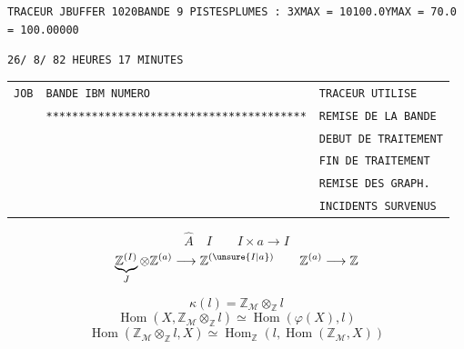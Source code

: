 
\noindent\texttt{TRACEUR J\quad BUFFER 1020\quad BANDE 9 PISTES\quad PLUMES : 3\quad XMAX = 10100.0\quad YMAX = 70.0\quad {} = 100.00000}

\noindent\texttt{26/ 8/ 82 HEURES 17 MINUTES}

\begin{tabular}{lll}
\texttt{JOB}&\texttt{BANDE IBM NUMERO}&\texttt{TRACEUR UTILISE}\\
&\texttt{****************************************}&\texttt{REMISE DE LA BANDE}\\
&&\texttt{DEBUT DE TRAITEMENT}\\
&&\texttt{FIN DE TRAITEMENT}\\
&&\texttt{REMISE DES GRAPH.}\\
&&\texttt{INCIDENTS SURVENUS}
\end{tabular}

\[
\widehat A\quad I\qquad I\times a\longrightarrow I
\]
\[
\underbrace{\mathbb Z^{(I)}}_J\otimes\mathbb Z^{(a)}\longrightarrow\mathbb Z^{(\unsure{I|a})}
\qquad \mathbb Z^{(a)}\longrightarrow\mathbb Z
\]


\[
\kappa(l)=\mathbb Z_{\mathcal M}\otimes_{\mathbb Z}l
\]
\[
\operatorname{Hom}(X,\mathbb Z_{\mathcal M}\otimes_{\mathbb Z}l)
\simeq\operatorname{Hom}(\varphi(X),l)
\]
\[
\operatorname{Hom}(\mathbb Z_{\mathcal M}\otimes_{\mathbb Z}l,X)
\simeq\operatorname{Hom}_{\mathbb Z}(l,\operatorname{Hom}(\mathbb Z_{\mathcal M},X))
\]

